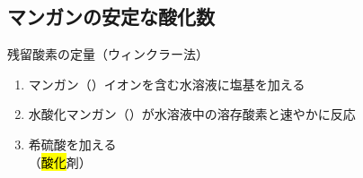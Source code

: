 \subsection{マンガンの安定な酸化数}
残留酸素の定量（ウィンクラー法）
\begin{enumerate}
      \item マンガン（）イオンを含む水溶液に塩基を加える\\
      \item 水酸化マンガン（）が水溶液中の溶存酸素と速やかに反応\\
      \item 希硫酸を加える\\
            （\hl{酸化}剤）
\end{enumerate}